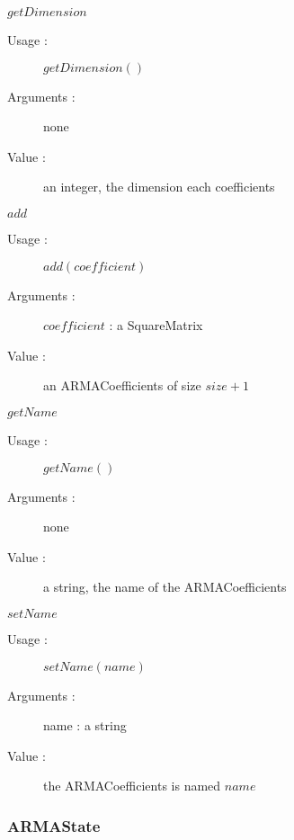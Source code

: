 \begin{description}
\begin{description}
   \item $getDimension$
    \begin{description}
    \item[Usage :] $getDimension()$
    \item[Arguments :] none
    \item[Value :]   an integer, the dimension each coefficients
    \end{description}
    \bigskip

   \item $add$
    \begin{description}
    \item[Usage :] $add(coefficient)$
    \item[Arguments :] $coefficient$ : a SquareMatrix
    \item[Value :]    an ARMACoefficients of size  $size +1$
    \end{description}
    \bigskip

  \item $getName$
    \begin{description}
    \item[Usage :] $getName()$
    \item[Arguments :] none
    \item[Value :] a string, the name of the ARMACoefficients
    \end{description}
    \bigskip

  \item $setName$
    \begin{description}
    \item[Usage :] $setName(name)$
    \item[Arguments :] name : a string
    \item[Value :] the ARMACoefficients is named $name$
    \end{description}
    \bigskip


  \end{description}

\end{description}



\newpage \subsubsection{ARMAState}


